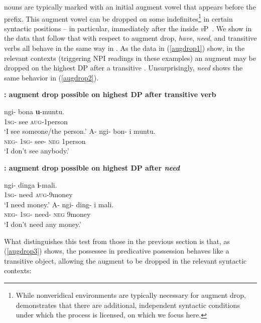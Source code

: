 \documentclass[output=paper,
modfonts
]{langscibook}
\begin{document}
 nouns are typically marked with an initial augment vowel that
appears before the  prefix. This augment vowel can be
dropped on some indefinites\footnote{While nonveridical environments are typically necessary for augment drop, \citet{Halpert:2012} demonstrates that there are additional, independent syntactic conditions under which the process is licensed, on which we focus here.}  in certain syntactic positions -- in
particular, immediately after the  inside {\it v}P\
\citep{Halpert:2012}. We show in the data that follow that with
respect to augment drop, {\it have}, {\it need}, and transitive verbs
all behave in the same way in \ili{Zulu}. As the data in (\ref{augdrop1}) show, in
the relevant contexts (triggering NPI readings in these examples) an augment may be dropped on the highest DP
after a transitive \isi{verb}.  Unsurprisingly, {\it need} shows the same behavior in (\ref{augdrop2}).

\begin{exe}

\ex\label{augdrop1}\textbf{: augment drop possible on highest DP after transitive verb}
\begin{xlist}
\ex \gll ngi- bona \textbf{u}-muntu.\\ 
1\textsc{sg}- see \textsc{aug}-1person\\
\glt `I see someone/the person.'
\ex \gll A- ngi- bon- i muntu.\\
\textsc{neg}- 1\textsc{sg}- see- \textsc{neg} 1person\\
\glt `I don't see anybody.' %


\end{xlist}

\ex\label{augdrop2}\textbf{: augment drop possible on highest DP after {\it need}}
\begin{xlist}
\ex \gll ngi- dinga \textbf{i}-mali.\\ 
1\textsc{sg}- need \textsc{aug}-9money\\
\glt `I need money.'
\ex \gll A- ngi- ding- i mali.\\
\textsc{neg}- 1\textsc{sg}- need- \textsc{neg} 9money\\
\glt `I don't need any money.'

\end{xlist}
\end{exe}


What distinguishes this test from those in the previous section is that, as (\ref{augdrop3}) shows,  the possessee in predicative possession behaves like a transitive object, allowing the augment to be dropped
in the relevant syntactic contexts: 
\end{document}
